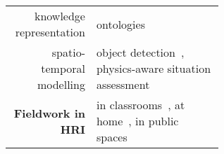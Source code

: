\begin{table}[h!]
\begin{tabular}{rp{0.6\linewidth}}
        knowledge representation & \small
        ontologies~\cite{lemaignan2010oro, lemaignan2013explicit} \\
        spatio-temporal modelling & \small object
        detection~\cite{wallbridge2017qualitative}, physics-aware situation
        assessment\cite{lemaignan2018underworlds,sallami2019simulation} \\
        \midrule
        \textbf{Fieldwork in HRI} & \small in
        classrooms~\cite{hood2015when, lemaignan2016learning, jacq2016building,
        baxter2015wider,kennedy2016cautious,senft2018robots}, at
        home~\cite{mondada2015ranger}, in public spaces~\cite{winkle2020insitu}\\
        \bottomrule
    \end{tabular}
    \label{pi-expertise}
\end{table}








